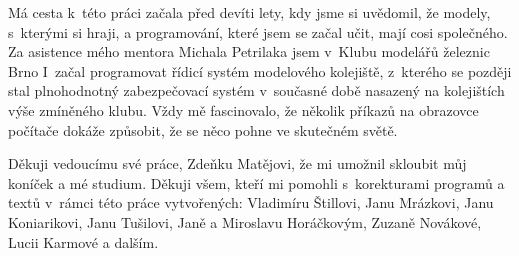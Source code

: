 Má cesta k~této práci začala před devíti lety, kdy jsme si uvědomil, že modely,
s~kterými si hraji, a programování, které jsem se začal učit, mají cosi
společného. Za asistence mého mentora Michala Petrilaka jsem v~Klubu modelářů
železnic Brno I~začal programovat řídicí systém modelového kolejiště, z~kterého
se později stal plnohodnotný zabezpečovací systém v~současné době nasazený na
kolejištích výše zmíněného klubu. Vždy mě fascinovalo, že několik příkazů na
obrazovce počítače dokáže způsobit, že se něco pohne ve skutečném světě.

Děkuji vedoucímu své práce, Zdeňku Matějovi, že mi umožnil skloubit můj koníček
a mé studium. Děkuji všem, kteří mi pomohli s~korekturami programů a textů
v~rámci této práce vytvořených: Vladimíru Štillovi, Janu Mrázkovi, Janu
Koniarikovi, Janu Tušilovi, Janě a Miroslavu Horáčkovým, Zuzaně Novákové,
Lucii Karmové a dalším.
